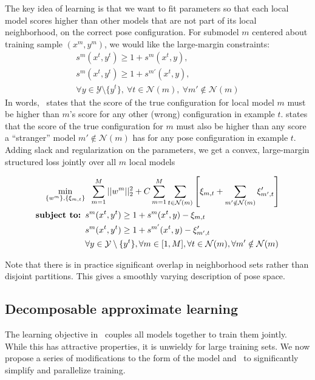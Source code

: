 The key idea of learning is that we want to fit parameters so that each local 
model scores higher than other models that are not part of its local 
neighborhood, on the correct pose configuration.  For submodel $m$ centered 
about training sample $(x^m,y^m)$, we would like the large-margin constraints:
\begin{align}
s^m(x^t,y^t) \geq 1 + s^{m}(x^t,y), \label{c1}\\
s^m(x^t,y^t) \geq 1 + s^{m'}(x^t,y),\label{c2}\\
\forall y \in \mathcal{Y}\setminus \{y^t\},~\forall t \in 
\mathcal{N}(m),~\forall m' \notin \mathcal{N}(m) \nonumber
\end{align}
In words,~ states that the score of the true configuration for local 
model $m$ must be higher than $m$'s score for any other (wrong) configuration 
in example $t$.   states that the score of the true configuration 
for $m$ must also be higher than any score a ``stranger'' model $m' \notin 
\mathcal{N}(m)$ has for any pose configuration in example $t$.  Adding slack 
and regularization on the parameters, we get a convex, large-margin structured 
loss jointly over all $m$ local models

\begin{align}\label{eq:full-learn}
\min_{\{w^m\}, \{\xi_{m,t}\}}& \;\; \sum_{m=1}^M ||w^m||_2^2 + C \sum_{m=1}^M 
\sum_{t \in \mathcal{N}(m)} \left[ \xi_{m,t} + \sum_{m' \notin \mathcal{N}(m)} 
\xi'_{m',t} \right] \\
\text{\bf{subject to:} }
&s^m(x^t,y^t) \geq 1 + s^{m}(x^t,y) - \xi_{m,t}\\
&s^m(x^t,y^t) \geq 1 + s^{m'}(x^t,y) - \xi'_{m',t}\\
&\forall y \in \mathcal{Y}\setminus \{y^t\}, \forall m \in [1,M], \forall t \in 
\mathcal{N}(m), \forall m' \notin \mathcal{N}(m) \nonumber \end{align}

Note that there is in practice significant overlap in neighborhood sets rather than disjoint partitions.  This gives a smoothly varying description of pose space.

\subsection{Decomposable approximate learning}
The learning objective in~ couples all models together to 
train them jointly.  While this has attractive properties, it is unwieldy for 
large training sets.  We now propose a series of modifications to the form of 
the model and~ to significantly simplify and parallelize 
training.

